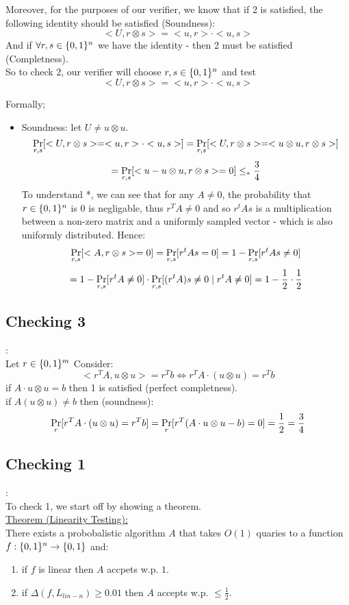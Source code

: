 Moreover, for the purposes of our verifier,
we know that if 2 is satisfied, the following
identity should be satisfied (Soundness):
\[
	<U, r\otimes s>
	=<u,r>\cdot<u,s>
\]
And if $\forall r,s\in\{0,1\}^n$ we have the identity - then
2 must be satisfied (Completness).\\

So to check $2$, our verifier will choose $r,s\in\{0,1\}^n$
and test \[
	<U, r\otimes s>
	=<u,r>\cdot<u,s>
\]

Formally;
\begin{itemize}
	\item Soundness: let $U\neq u\otimes u$.
	\[
		\operatorname*{Pr}_{r,s}[<U,r\otimes s>=<u,r>\cdot<u,s>]	
		=\operatorname*{Pr}_{r,s}[<U,r\otimes s>=<u\otimes u, r\otimes s>]
	\]\[
		=\operatorname*{Pr}_{r,s}[<u-u\otimes u, r\otimes s>=0]\leq_* \frac{3}{4}
	\]
	To understand *, we can see that for any $A\neq 0$,
	the probability that $r\in\{0,1\}^n$ is $0$ is negligable,
	thus $r^TA\neq 0$ and so $r^tAs$ is a multiplication
	between a non-zero matrix and a uniformly sampled vector - which
	is also uniformly distributed. Hence:
	\[
		\operatorname*{Pr}_{r,s}[<A,r\otimes s>=0]
		=\operatorname*{Pr}_{r,s}[r^tAs=0]
		=1-\operatorname*{Pr}_{r,s}[r^tAs\neq 0]
	\]\[
		=1-\operatorname*{Pr}_{r,s}[r^tA\neq 0]\cdot \operatorname*{Pr}_{r,s}[(r^tA)s\neq 0\mid r^tA\neq 0]
		=1-\frac{1}{2}\cdot\frac{1}{2}
	\]
\end{itemize}

\subsection*{Checking 3}:\\
Let $r\in\{0,1\}^m$ Consider:
\[
	<r^TA,u\otimes u>=r^Tb
	\Leftrightarrow
	r^TA\cdot(u\otimes u)=r^Tb
\]
if $A\cdot u\otimes u=b$ then 1 is satisfied (perfect completness).\\
if $A(u\otimes u)\neq b$ then (soundness):
\[
	\operatorname*{Pr}_r[r^TA\cdot(u\otimes u)=r^Tb]
	=\operatorname*{Pr}_r[r^T(A\cdot u\otimes u-b)=0]=\frac{1}{2}=\frac{3}{4}	
\] 

\subsection*{Checking 1}:\\
To check 1, we start off by showing a theorem.\\
\underline{Theorem (Linearity Testing):}\\
There exists a probobalistic algorithm $A$ that
takes $O(1)$ quaries to a function $f:\{0,1\}^n\rightarrow \{0,1\}$ and:
\begin{enumerate}[label=(\alph*)]
	\item if $f$ is linear then $A$ accpets w.p. $1$.
	\item if $\Delta(f,L_{lin-n})\geq 0.01$ then $A$ accepts w.p. $\leq \frac{1}{2}$.
\end{enumerate}

